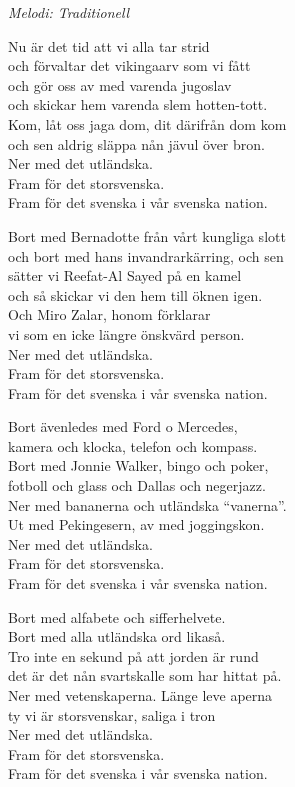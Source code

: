 {\footnotesize\textit{Melodi: Traditionell}}\par
\vspace{10pt}
Nu är det tid att vi alla tar strid\\
och förvaltar det vikingaarv som vi fått\\
och gör oss av med varenda jugoslav\\
och skickar hem varenda slem hotten-tott.\\
Kom, låt oss jaga dom, dit därifrån dom kom\\
och sen aldrig släppa nån jävul över bron.\\
Ner med det utländska.\\
Fram för det storsvenska.\\
Fram för det svenska i vår svenska nation. \par
\vspace{6pt}
Bort med Bernadotte från vårt kungliga slott\\
och bort med hans invandrarkärring, och sen\\
sätter vi Reefat-Al Sayed på en kamel\\
och så skickar vi den hem till öknen igen.\\
Och Miro Zalar, honom förklarar\\
vi som en icke längre önskvärd person.\\
Ner med det utländska.\\
Fram för det storsvenska.\\
Fram för det svenska i vår svenska nation. \par
\vspace{6pt}
Bort ävenledes med Ford o Mercedes,\\
kamera och klocka, telefon och kompass.\\
Bort med Jonnie Walker, bingo och poker,\\
fotboll och glass och Dallas och negerjazz.\\
Ner med bananerna och utländska ``vanerna''.\\
Ut med Pekingesern, av med joggingskon.\\
Ner med det utländska.\\
Fram för det storsvenska.\\
Fram för det svenska i vår svenska nation. \par
\newpage
Bort med alfabete och sifferhelvete.\\
Bort med alla utländska ord likaså.\\
Tro inte en sekund på att jorden är rund\\
det är det nån svartskalle som har hittat på.\\
Ner med vetenskaperna. Länge leve aperna\\
ty vi är storsvenskar, saliga i tron\\
Ner med det utländska.\\
Fram för det storsvenska.\\
Fram för det svenska i vår svenska nation. 
